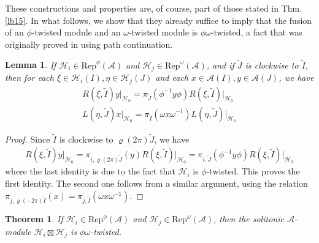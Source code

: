 \documentclass[11pt,b5paper,notitlepage]{article}
\theoremstyle{definition}
\theoremstyle{plain}
\newtheorem{thm}[df]{Theorem}
\newtheorem{lm}[df]{Lemma}
\newcommand{\wtd}{\widetilde}
\newcommand{\Rep}{\mathrm{Rep}}
\newcommand{\MA}{\mathcal A}
\newcommand{\MH}{\mathcal H}
\numberwithin{equation}{section}
\begin{document}
These constructions and properties are, of course, part of those stated in Thm. \ref{lb15}. In what follows, we show that they already suffice to imply that the fusion of an $\phi$-twisted module and an $\omega$-twisted module is $\phi\omega$-twisted, a fact that was originally proved in \cite{MS26a} using path continuation.







\begin{lm}\label{lb19}
If $\MH_i\in\Rep^\phi(\MA)$ and $\MH_j\in\Rep^\omega(\MA)$, and if $\wtd J$ is clockwise to $\wtd I$, then for each $\xi\in\MH_i(I),\eta\in\MH_j(J)$ and each $x\in\MA(I),y\in\MA(J)$, we have
\begin{gather*}
R(\xi,\wtd I)y\big|_{\MH_0}=\pi_{\wtd J}(\phi^{-1}y\phi)R(\xi,\wtd I)\big|_{\MH_0}\\
L(\eta,\wtd J)x\big|_{\MH_0}=\pi_{\wtd I}(\omega x\omega^{-1})L(\eta,\wtd J)\big|_{\MH_0}
\end{gather*}
\end{lm}

\begin{proof}
Since $\wtd I$ is clockwise to $\varrho(2\pi)\wtd J$, we have
\begin{align*}
R(\xi,\wtd I)y\big|_{\MH_0}=\pi_{i,\varrho(2\pi)\wtd J}(y)R(\xi,\wtd I)\big|_{\MH_0}=\pi_{i,\wtd J}(\phi^{-1}y\phi)R(\xi,\wtd I)\big|_{\MH_0}
\end{align*}
where the last identity is due to the fact that $\MH_i$ is $\phi$-twisted. This proves the first identity. The second one follows from a similar argument, using the relation $\pi_{j,\varrho(-2\pi)\wtd I}(x)=\pi_{j,\wtd I}(\omega x\omega^{-1})$.
\end{proof}




\begin{thm}
If $\MH_i\in\Rep^\phi(\MA)$ and $\MH_j\in\Rep^\omega(\MA)$, then the solitonic $\MA$-module $\MH_i\boxtimes\MH_j$ is $\phi\omega$-twisted.
\end{thm}
\end{document}

